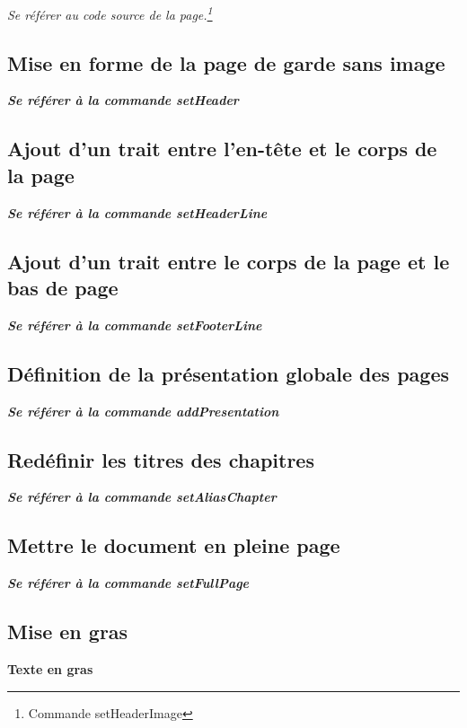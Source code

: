 \documentclass[12pt]{report}
\renewcommand{\bold}[1]{\textbf{#1}}
\newcommand{\italic}[1]{\textit{#1}}
\newcommand{\bi}[1]{\textit{\textbf{#1}}}
\begin{document}
\italic{Se référer au code source de la page.\footnote{Commande setHeaderImage}}

\subsection{Mise en forme de la page de garde sans image}

\bi{Se référer à la commande setHeader}

\subsection{Ajout d'un trait entre l'en-tête et le corps de la page}

\bi{Se référer à la commande setHeaderLine}

\subsection{Ajout d'un trait entre le corps de la page et le bas de page}

\bi{Se référer à la commande setFooterLine}

\subsection{Définition de la présentation globale des pages}

\bi{Se référer à la commande addPresentation}


\subsection{Redéfinir les titres des chapitres}

\bi{Se référer à la commande setAliasChapter}

\subsection{Mettre le document en pleine page}

\bi{Se référer à la commande setFullPage}

\subsection{Mise en gras}

\bold{Texte en gras}
\end{document}
